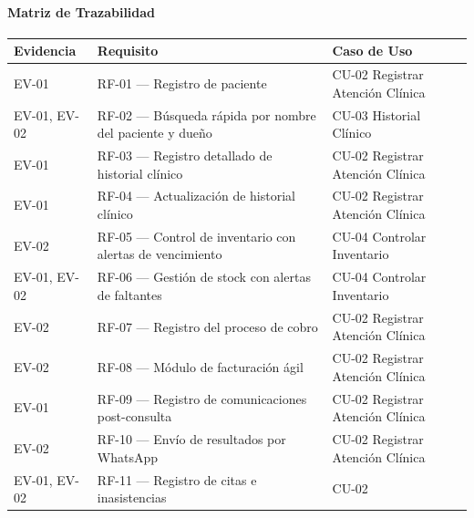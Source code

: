 \documentclass[
]{article}
\newcounter{none} %
\begin{document}
\paragraph{Matriz de Trazabilidad}\label{matriz-de-trazabilidad-1}

{\def\LTcaptype{none} %
\begin{longtable}[]{|
  >{\raggedright\arraybackslash}p{}|
  >{\raggedright\arraybackslash}p{}|
  >{\raggedright\arraybackslash}p{}|}
\hline
\begin{minipage}[b]{\linewidth}\raggedright
\textbf{Evidencia}
\end{minipage} & \begin{minipage}[b]{\linewidth}\centering
\textbf{Requisito}
\end{minipage} & \begin{minipage}[b]{\linewidth}\raggedright
\textbf{Caso de Uso}
\end{minipage} \\
\hline
\endhead
\hline
\endlastfoot
EV-01 & RF-01 --- Registro de paciente & CU-02 Registrar Atención
Clínica \\
\hline
EV-01, EV-02 & RF-02 --- Búsqueda rápida por nombre del paciente y dueño
& CU-03 Historial Clínico \\
\hline
EV-01 & RF-03 --- Registro detallado de historial clínico & CU-02
Registrar Atención Clínica \\
\hline
EV-01 & RF-04 --- Actualización de historial clínico & CU-02 Registrar
Atención Clínica \\
\hline
EV-02 & RF-05 --- Control de inventario con alertas de vencimiento &
CU-04 Controlar Inventario \\
\hline
EV-01, EV-02 & RF-06 --- Gestión de stock con alertas de faltantes &
CU-04 Controlar Inventario \\
\hline
EV-02 & RF-07 --- Registro del proceso de cobro & CU-02 Registrar
Atención Clínica \\
\hline
EV-02 & RF-08 --- Módulo de facturación ágil & CU-02 Registrar Atención
Clínica \\
\hline
EV-01 & RF-09 --- Registro de comunicaciones post-consulta & CU-02
Registrar Atención Clínica \\
\hline
EV-02 & RF-10 --- Envío de resultados por WhatsApp & CU-02 Registrar
Atención Clínica \\
\hline
EV-01, EV-02 & RF-11 --- Registro de citas e inasistencias & CU-02

\end{longtable}}
\end{document}
